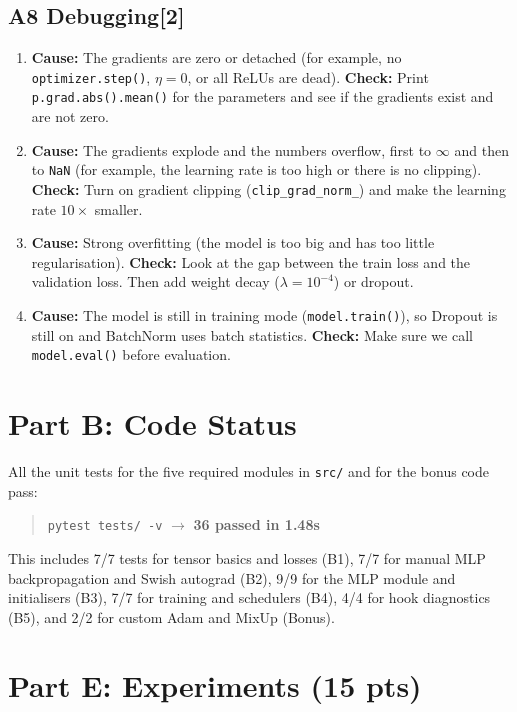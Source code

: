 \documentclass[conference,a4paper]{IEEEtran}
\newcommand{\task}[2]{\subsection{#1\hfill[#2]}}
\begin{document}
\task{A8 Debugging}{2}
\begin{enumerate}\setlength{\itemsep}{1pt}
  \item[(i)] \textbf{Cause:} The gradients are zero or detached (for example, no \texttt{optimizer.step()}, $\eta=0$, or all ReLUs are dead). \textbf{Check:} Print \texttt{p.grad.abs().mean()} for the parameters and see if the gradients exist and are not zero.
  \item[(ii)] \textbf{Cause:} The gradients explode and the numbers overflow, first to $\infty$ and then to \texttt{NaN} (for example, the learning rate is too high or there is no clipping). \textbf{Check:} Turn on gradient clipping (\texttt{clip\_grad\_norm\_}) and make the learning rate $10\times$ smaller.
  \item[(iii)] \textbf{Cause:} Strong overfitting (the model is too big and has too little regularisation). \textbf{Check:} Look at the gap between the train loss and the validation loss. Then add weight decay ($\lambda=10^{-4}$) or dropout.
  \item[(iv)] \textbf{Cause:} The model is still in training mode (\texttt{model.train()}), so Dropout is still on and BatchNorm uses batch statistics. \textbf{Check:} Make sure we call \texttt{model.eval()} before evaluation.
\end{enumerate}

\section{Part B: Code Status}
All the unit tests for the five required modules in \texttt{src/} and for the bonus code pass:
\begin{quote}
\texttt{pytest tests/ -v} $\longrightarrow$ \textbf{36 passed in 1.48s}
\end{quote}
This includes 7/7 tests for tensor basics and losses (B1), 7/7 for manual MLP backpropagation and Swish autograd (B2), 9/9 for the MLP module and initialisers (B3), 7/7 for training and schedulers (B4), 4/4 for hook diagnostics (B5), and 2/2 for custom Adam and MixUp (Bonus).

\section{Part E: Experiments (15 pts)}
\end{document}
